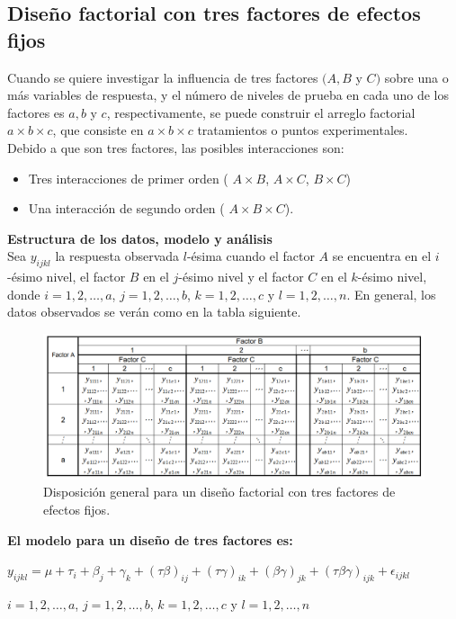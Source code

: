 \subsection{Diseño factorial con tres factores de efectos fijos}
Cuando se quiere investigar la influencia de tres factores $(A, B$ y $C)$ sobre una o más variables de respuesta, y el número de niveles de prueba en cada uno de los factores es $a, b$ y $c$, respectivamente, se puede construir el arreglo factorial $a \times b \times c$, que consiste en $a \times b \times c$ tratamientos o puntos experimentales.\\


Debido a que son tres factores, las posibles interacciones son:
\begin{itemize}
	\item Tres interacciones de primer orden ( $A \times B $,  $A \times C $,  $B \times C $)
	\item Una interacción de segundo orden ( $A \times B \times C $).
\end{itemize}

\textbf{Estructura de los datos, modelo y análisis}\\
Sea $y_{ijkl}$ la respuesta observada $l$-ésima cuando el factor $A$ se encuentra en el $i$-ésimo nivel, el factor $B$ en el $j$-ésimo nivel y el factor $C$ en el $k$-ésimo nivel, donde  $i = 1,2, \dots, a$, $j = 1,2, \dots, b$, $k = 1,2, \dots, c$  y $l = 1,2, \dots, n$. En general, los datos observados se verán como en la tabla siguiente.


\begin{figure}[H] 
	\centering 
	\includegraphics[width=0.90\linewidth]{img/factorial.png} 
	\caption{Disposición general para un diseño factorial con tres factores de efectos fijos.} 
	\label{fig:FactorialTres}
\end{figure}
\FloatBarrier

\textbf{El modelo para un diseño de tres factores es:}\\
	\begin{center}
	$y_{ijkl}=\mu + \tau_{i} + \beta_{j} + \gamma_{k} + (\tau \beta)_{ij} +(\tau \gamma)_{ik} + (\beta \gamma)_{jk} + (\tau \beta \gamma)_{ijk} + \epsilon_{ijkl} $

	$i = 1,2, \dots, a$, $j = 1,2, \dots, b$, $k = 1,2, \dots, c$  y $l = 1,2, \dots, n$
 \end{center}
 
